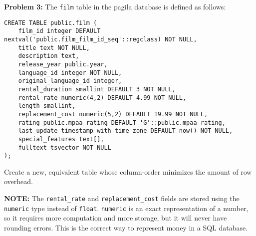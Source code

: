 \documentclass[10pt]{article}
\theoremstyle{definition}
\begin{document}
\newpage
\textbf{Problem 3:}
The \lstinline{film} table in the pagila database is defined as follows:
\begin{lstlisting}
CREATE TABLE public.film (
    film_id integer DEFAULT nextval('public.film_film_id_seq'::regclass) NOT NULL,
    title text NOT NULL,
    description text,
    release_year public.year,
    language_id integer NOT NULL,
    original_language_id integer,
    rental_duration smallint DEFAULT 3 NOT NULL,
    rental_rate numeric(4,2) DEFAULT 4.99 NOT NULL,
    length smallint,
    replacement_cost numeric(5,2) DEFAULT 19.99 NOT NULL,
    rating public.mpaa_rating DEFAULT 'G'::public.mpaa_rating,
    last_update timestamp with time zone DEFAULT now() NOT NULL,
    special_features text[],
    fulltext tsvector NOT NULL
);
\end{lstlisting}
Create a new, equivalent table whose column-order minimizes the amount of row overhead.

\vspace{5in}
\noindent
\textbf{NOTE:}
The \lstinline{rental_rate} and \lstinline{replacement_cost} fields are stored using the \lstinline{numeric} type instead of \lstinline{float}.
\lstinline{numeric} is an exact representation of a number, so it requires more computation and more storage, but it will never have rounding errors.
This is the correct way to represent money in a SQL database.
\end{document}
